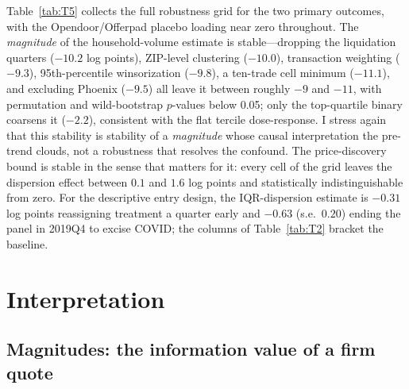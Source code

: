 \documentclass[12pt, letterpaper]{article}
\theoremstyle{remark}
\begin{document}
Table~\ref{tab:T5} collects the full robustness grid for the two primary outcomes, with the Opendoor/Offerpad placebo loading near zero throughout. The \emph{magnitude} of the household-volume estimate is stable---dropping the liquidation quarters ($-10.2$ log points), ZIP-level clustering ($-10.0$), transaction weighting ($-9.3$), 95th-percentile winsorization ($-9.8$), a ten-trade cell minimum ($-11.1$), and excluding Phoenix ($-9.5$) all leave it between roughly $-9$ and $-11$, with permutation and wild-bootstrap $p$-values below 0.05; only the top-quartile binary coarsens it ($-2.2$), consistent with the flat tercile dose-response. I stress again that this stability is stability of a \emph{magnitude} whose causal interpretation the pre-trend clouds, not a robustness that resolves the confound. The price-discovery bound is stable in the sense that matters for it: every cell of the grid leaves the dispersion effect between $0.1$ and $1.6$ log points and statistically indistinguishable from zero. For the descriptive entry design, the IQR-dispersion estimate is $-0.31$ log points reassigning treatment a quarter early and $-0.63$ (s.e.\ $0.20$) ending the panel in 2019Q4 to excise COVID; the columns of Table~\ref{tab:T2} bracket the baseline.




\section{Interpretation}\label{sec:interpretation}

\subsection{Magnitudes: the information value of a firm quote}\label{sec:interp-magnitudes}
\end{document}
